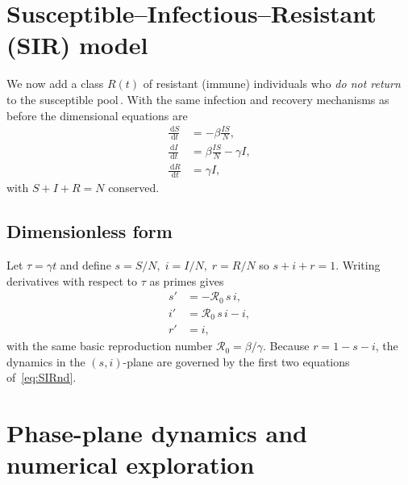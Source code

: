 \documentclass[11pt]{article}
\newcommand{\dd}{\,\mathrm{d}}
\newcommand{\RR}{\mathcal{R}_0}
\begin{document}
\section{Susceptible–Infectious–Resistant (SIR) model}
\label{sec:SIR}

We now add a class $R(t)$ of resistant (immune) individuals who
\emph{do not return} to the susceptible pool\,\citep{Kermack1927}.  
With the same infection and recovery mechanisms as before
the dimensional equations are
\begin{align*}
\frac{\dd S}{\dd t} &= -\beta \frac{I S}{N} ,          \\
\frac{\dd I}{\dd t} &=  \beta \frac{I S}{N}-\gamma I, \\
\frac{\dd R}{\dd t} &= \gamma I,
\end{align*}
with $S+I+R=N$ conserved.

\subsection*{Dimensionless form}
Let $\tau=\gamma t$ and define
\(s=S/N,\; i=I/N,\; r=R/N\) so $s+i+r=1$.
Writing derivatives with respect to $\tau$ as primes gives
\begin{subequations}\label{eq:SIRnd}
\begin{align}
s' &= -\RR\,s\,i,          \\
i' &=  \RR\,s\,i-i,        \\
r' &= i,
\end{align}
\end{subequations}
with the same basic reproduction number
\(\RR=\beta/\gamma\).
Because $r=1-s-i$, the dynamics in the
\((s,i)\)-plane are governed by the first two equations of~\cref{eq:SIRnd}.

\section{Phase-plane dynamics and numerical exploration}
\label{sec:PhasePlane}

\end{document}
